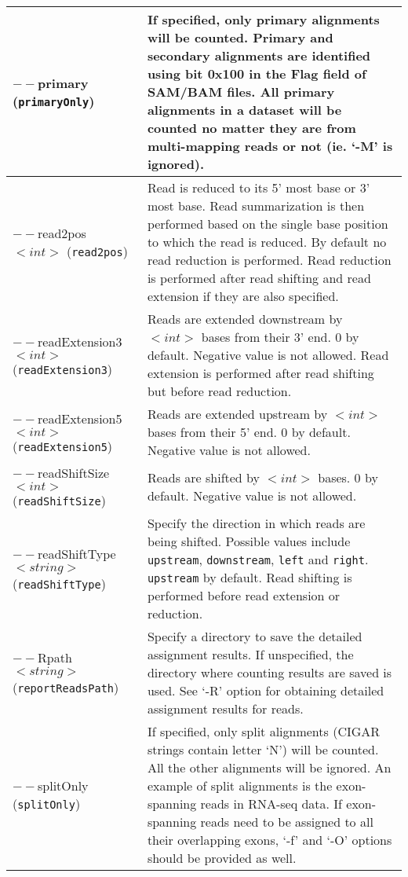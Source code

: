 \documentclass[12pt]{report}
\newcommand{\code}[1]{{\small\texttt{#1}}}
\begin{document}
\begin{longtable}{|p{5cm}|p{11cm}|}
\hline
$--$primary \newline (\code{primaryOnly}) & If specified, only primary alignments will be counted. Primary and secondary alignments are identified using bit 0x100 in the Flag field of SAM/BAM files. All primary alignments in a dataset will be counted no matter they are from multi-mapping reads or not (ie. `-M' is ignored).\\
\hline
$--$read2pos $<int>$ \newline (\code{read2pos}) & Read is reduced to its 5' most base or 3' most base. Read summarization is then performed based on the single base position to which the read is reduced. By default no read reduction is performed. Read reduction is performed after read shifting and read extension if they are also specified. \\
\hline
$--$readExtension3 $<int>$ \newline (\code{readExtension3}) & Reads are extended downstream by $<int>$ bases from their 3' end. 0 by default. Negative value is not allowed. Read extension is performed after read shifting but before read reduction.\\
\hline
$--$readExtension5 $<int>$ \newline (\code{readExtension5}) & Reads are extended upstream by $<int>$ bases from their 5' end. 0 by default. Negative value is not allowed. \\
\hline
$--$readShiftSize $<int>$ \newline (\code{readShiftSize}) & Reads are shifted by $<int>$ bases. 0 by default. Negative value is not allowed. \\
\hline
$--$readShiftType $<string>$ \newline (\code{readShiftType}) & Specify the direction in which reads are being shifted. Possible values include \code{upstream}, \code{downstream}, \code{left} and \code{right}.  \code{upstream} by default. Read shifting is performed before read extension or reduction. \\
\hline
$--$Rpath $<string>$ \newline (\code{reportReadsPath}) & Specify a directory to save the detailed assignment results. If unspecified, the directory where counting results are saved is used. See `-R' option for obtaining detailed assignment results for reads.\\
\hline
$--$splitOnly \newline (\code{splitOnly}) & If specified, only split alignments (CIGAR strings contain letter `N') will be counted. All the other alignments will be ignored. An example of split alignments is the exon-spanning reads in RNA-seq data. If exon-spanning reads need to be assigned to all their overlapping exons, `-f' and `-O' options should be provided as well.\\

\end{longtable}
\end{document}
